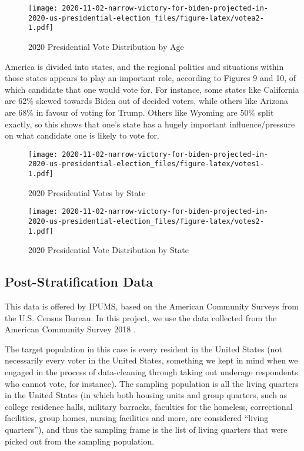 \documentclass[
]{article}
\begin{document}
\begin{figure}
\centering
\texttt{[image: 2020-11-02-narrow-victory-for-biden-projected-in-2020-us-presidential-election\_files/figure-latex/votea2-1.pdf]}
\caption{\label{fig:votea2}2020 Presidential Vote Distribution by Age}
\end{figure}

America is divided into states, and the regional politics and situations within those states appears to play an important role, according to Figures 9 and 10, of which candidate that one would vote for. For instance, some states like California are 62\% skewed towards Biden out of decided voters, while others like Arizona are 68\% in favour of voting for Trump. Others like Wyoming are 50\% split exactly, so this shows that one's state has a hugely important influence/pressure on what candidate one is likely to vote for.

\begin{figure}
\centering
\texttt{[image: 2020-11-02-narrow-victory-for-biden-projected-in-2020-us-presidential-election\_files/figure-latex/votes1-1.pdf]}
\caption{\label{fig:votes1}2020 Presidential Votes by State}
\end{figure}

\begin{figure}
\centering
\texttt{[image: 2020-11-02-narrow-victory-for-biden-projected-in-2020-us-presidential-election\_files/figure-latex/votes2-1.pdf]}
\caption{\label{fig:votes2}2020 Presidential Vote Distribution by State}
\end{figure}

\hypertarget{post-stratification-data}{%
\subsection{Post-Stratification Data}\label{post-stratification-data}}

This data is offered by IPUMS, based on the American Community Surveys from the U.S. Census Bureau. In this project, we use the data collected from the American Community Survey 2018 \citep{citeIPUMS}.

The target population in this case is every resident in the United States (not necessarily every voter in the United States, something we kept in mind when we engaged in the process of data-cleaning through taking out underage respondents who cannot vote, for instance). The sampling population is all the living quarters in the United States (in which both housing units and group quarters, such as college residence halls, military barracks, faculties for the homeless, correctional facilities, group homes, nursing facilities and more, are considered ``living quarters''), and thus the sampling frame is the list of living quarters that were picked out from the sampling population.
\end{document}
